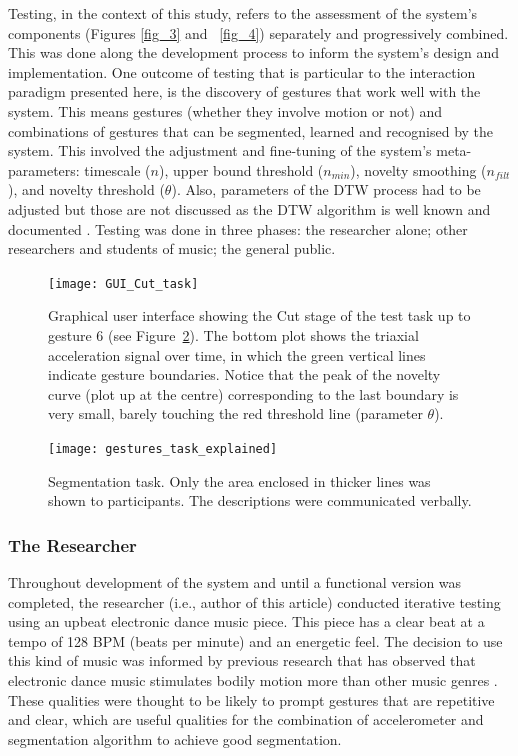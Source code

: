 \documentclass{nime-alternate_MANUSCRIPT} %
\begin{document}
Testing, in the context of this study, refers to the assessment of the system’s components (Figures \ref{fig_3} and ~\ref{fig_4}) separately and progressively combined. This was done along the development process to inform the system’s design and implementation. One outcome of testing that is particular to the interaction paradigm presented here, is the discovery of gestures that work well with the system. This means gestures (whether they involve motion or not) and combinations of gestures that can be segmented, learned and recognised by the system. This involved the adjustment and fine-tuning of the system’s meta-parameters: timescale ($n$), upper bound threshold ($n_{min}$), novelty smoothing ($n_{filt}$), and novelty threshold ($\theta$). Also, parameters of the DTW process had to be adjusted but those are not discussed as the DTW algorithm is well known and documented \cite{Gillian_etal_2011, Wekinator_website}. Testing was done in three phases: the researcher alone; other researchers and students of music; the general public.

\begin{figure}[t!]
	\centering
		\texttt{[image: GUI\_Cut\_task]}
\caption{Graphical user interface showing the Cut stage of the test task up to gesture 6 (see Figure~\ref{fig_6}). The bottom plot shows the triaxial acceleration signal over time, in which the green vertical lines indicate gesture boundaries. Notice that the peak of the novelty curve (plot up at the centre) corresponding to the last boundary is very small, barely touching the red threshold line (parameter $\theta$).}
	\label{fig_5}
\end{figure}

\begin{figure}[t!]
	\centering
		\texttt{[image: gestures\_task\_explained]}
	\caption{Segmentation task. Only the area enclosed in thicker lines was shown to participants. The descriptions were communicated verbally.}
	\label{fig_6}
\end{figure}

\subsubsection{The Researcher}

Throughout  development of the system and until a functional version was completed, the researcher (i.e., author of this article) conducted iterative testing using an upbeat electronic dance music piece. This piece has a clear beat at a tempo of 128 BPM (beats per minute) and an energetic feel. The decision to use this kind of music was informed by previous research that has observed that electronic dance music stimulates bodily motion more than other music genres \cite{Burger_Toiviainen_2020}. These qualities were thought to be likely to prompt gestures that are repetitive and clear, which are useful qualities for the combination of accelerometer and segmentation algorithm to achieve good segmentation. 
\end{document}
